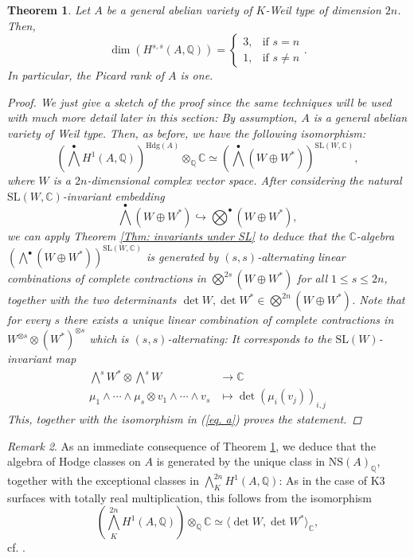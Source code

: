 \documentclass[11pt,twoside,a4paper]{amsart}
\newcommand{\0}{\mathscr{O}}
\newcommand{\Q}{\mathbb{Q}}
\newcommand{\C}{\mathbb{C}}
\theoremstyle{plain}
\newtheorem{thm}{Theorem}[section]
\theoremstyle{definition}
\theoremstyle{remark}
\newtheorem{rmk}[thm]{Remark}
\begin{document}
\begin{thm}\cite[Thm.\ 6.12]{weil}
\label{Thm.: dimension of Hodge ring for general abelian varieties of Weil type}
Let $A$ be a general abelian variety of $K$-Weil type of dimension $2n$. Then, 
\[
\dim(H^{s,s}(A,\Q))=
\begin{cases} 3, & \mbox{if }s=n \\ 1, & \mbox{if }s \not =n
\end{cases}.
\]
In particular, the Picard rank of $A$ is one.
\begin{proof}
We just give a sketch of the proof since the same techniques will be used with much more detail later in this section: By assumption, $A$ is a general abelian variety of Weil type. Then, as before, we have the following isomorphism:
\begin{equation}
    \label{eq. a}
    \textstyle\left(\bigwedge^{\bullet}H^1(A,\Q)\right)^{\mathrm{Hdg}(A)}\otimes_\Q\C\simeq
\left(\bigwedge^{\bullet}(W\oplus W^*)\right)^{\mathrm{SL}(W,\C)},
\end{equation}
where $W$ is a $2n$-dimensional complex vector space.
After considering the natural $\mathrm{SL}(W,\C)$-invariant embedding \[\textstyle\bigwedge^{\bullet}(W\oplus W^*)\hookrightarrow\bigotimes^{\bullet}(W\oplus W^*),\]
we can apply Theorem \ref{Thm: invariants under SL} to deduce that the $\C$-algebra $\left(\bigwedge^{\bullet}(W\oplus W^*)\right)^{\mathrm{SL}(W,\C)}$ is generated by $(s,s)$-alternating linear combinations of complete contractions in $\bigotimes^{2s}(W\oplus W^*)$ for all $1\leq s\leq 2n$, together with the two determinants $\det W, \det W^*\in \bigotimes^{2n}(W\oplus W^*)$. 
Note that for every $s$ there exists a unique linear combination of complete contractions in $W^{\otimes s}\otimes (W^*)^{\otimes s}$ which is $(s,s)$-alternating: It corresponds to the $\mathrm{SL}(W)$-invariant map
\begin{align*}
  \textstyle  \bigwedge^s W^*\otimes \bigwedge^s W&\longrightarrow\C\\
   \mu_1\wedge\cdots\wedge\mu_s\otimes v_1\wedge\cdots\wedge v_s&\longmapsto \det (\mu_i(v_j))_{i,j}
\end{align*} 
This, together with the isomorphism in (\ref{eq. a}) proves the statement.
\end{proof}
\end{thm}
\begin{rmk}
\label{rmk.: Hodge classes abelian var of weil type}
As an immediate consequence of Theorem \ref{Thm.: dimension of Hodge ring for general abelian varieties of Weil type}, we deduce that the algebra of Hodge classes on $A$ is generated by the unique class in $\mathrm{NS}(A)_\Q$, together with the exceptional classes in $\bigwedge^{2n}_{K}H^1(A,\Q)$: As in the case of K3 surfaces with totally real multiplication, this follows from the isomorphism
\[
\textstyle
\left( \bigwedge^{2n}_{K}H^1(A,\Q) \right)\otimes_\Q \C\simeq\langle \det W,\det W^*\rangle_\C,
\]
cf. \cite[Prop.\ 4.4]{deligne1982hodge}.
\end{rmk}
\end{document}
